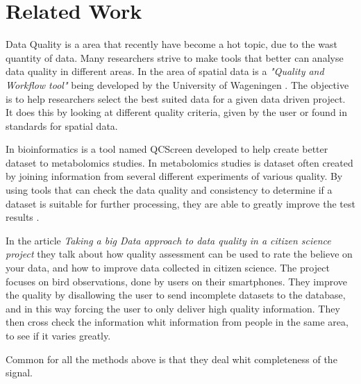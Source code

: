 
\section{Related Work}
Data Quality is a area that recently have become a hot topic, due to the wast quantity of data. Many researchers strive to make tools that better can analyse data quality in different areas. In the area of spatial data is a \emph{"Quality and Workflow tool"} being developed by the University of Wageningen \citep{RefWorks:8}. The objective is to help researchers select the best suited data for a given data driven project. It does this by looking at different quality criteria, given by the user or found in standards for spatial data. 

In bioinformatics is a tool named QCScreen developed to help create better dataset to metabolomics studies. In metabolomics studies is dataset often created by joining information from several different experiments of various quality. By using tools that can check the data quality and consistency to determine if a dataset is suitable for further processing, they are able to greatly improve the test results \citep{RefWorks:9}.
 
In the article \emph{Taking a big Data approach to data quality in a citizen science project} they talk about how quality assessment can be used to rate the 
believe on your data, and how to improve data collected in citizen science. The project focuses on bird observations, done by users on their smartphones. They improve the quality by disallowing the user to send incomplete datasets to the database, and in this way forcing the user to only deliver high quality information. They then cross check the information whit information from people in the same area, to see if it varies greatly\citep{RefWorks:2}. 

Common for all the methods above is that they deal whit completeness of the signal.
